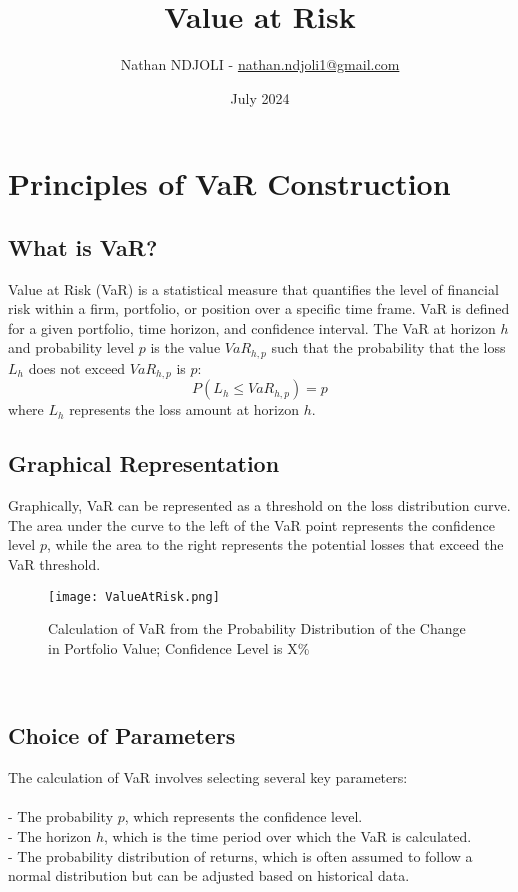 \documentclass[a4paper,10pt]{article}
\title{Value at Risk}
\author{Nathan NDJOLI - \href{mailto:nathan.ndjoli1@gmail.com}{nathan.ndjoli1@gmail.com}}
\date{July 2024}
\begin{document}
\maketitle

\section{Principles of VaR Construction}

\subsection{What is VaR?}

\noindent Value at Risk (VaR) is a statistical measure that quantifies the level of financial risk within a firm, portfolio, or position over a specific time frame. VaR is defined for a given portfolio, time horizon, and confidence interval. The VaR at horizon \(h\) and probability level \(p\) is the value \(VaR_{h,p}\) such that the probability that the loss \(L_h\) does not exceed \(VaR_{h,p}\) is \(p\):\\
\[P(L_h \leq VaR_{h,p}) = p\] where \(L_h\) represents the loss amount at horizon \(h\).\\

\subsection{Graphical Representation}

\noindent Graphically, VaR can be represented as a threshold on the loss distribution curve. The area under the curve to the left of the VaR point represents the confidence level \(p\), while the area to the right represents the potential losses that exceed the VaR threshold.\\

\begin{figure}[htbp]
    \centering
    \texttt{[image: ValueAtRisk.png]}
    \caption{Calculation of VaR from the Probability Distribution of the Change in Portfolio Value; Confidence Level is X\%}
    \label{fig:var-calculation}
\end{figure}\\

\subsection{Choice of Parameters}

\noindent The calculation of VaR involves selecting several key parameters:\\\\
\noindent - The probability \(p\), which represents the confidence level.\\
\noindent - The horizon \(h\), which is the time period over which the VaR is calculated.\\
\noindent - The probability distribution of returns, which is often assumed to follow a normal distribution but can be adjusted based on historical data.\\
\end{document}
